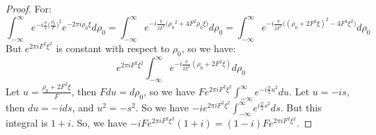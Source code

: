 \documentclass[crop=false,class=book,oneside]{standalone}
\begin{document}
            \begin{proof}
            For:
            \begin{equation*}
                \int_{-\infty}^{\infty} e^{-i\frac{\pi}{2}\big(\frac{\rho_0}{F}\big)^2}e^{-2\pi i \rho_0 \xi}d\rho_0 = \int_{-\infty}^{\infty} e^{-i\frac{\pi}{2F^2}\big({\rho_0}^2 + 4F^2 \rho_0 \xi\big)}d\rho_0 = \int_{-\infty}^{\infty} e^{-i\frac{\pi}{2F^2}\big((\rho_0+2F^2\xi)^2 - 4F^4\xi^2\big)}d\rho_0
            \end{equation*}
            But $e^{2\pi i F^2 \xi^2}$ is constant with respect to $\rho_0$, so we have:
            \begin{equation*}
                e^{2\pi i F^2 \xi^2} \int_{-\infty}^{\infty} e^{-i\frac{\pi}{2F^2}(\rho_0+2F^2\xi)}d\rho_0    
            \end{equation*}
            Let $u = \frac{\rho_0 + 2F^2 \xi}{F}$, then $Fdu = d\rho_0$, so we have $Fe^{2\pi i F^2 \xi^2} \int_{-\infty}^{\infty} e^{-i\frac{\pi}{2}u^2}du$. Let $u = -is$, then $du = -ids$, and $u^2 = -s^2$. So we have $-i e^{2\pi i F^2 \xi^2}\int_{-\infty}^{\infty} e^{i\frac{\pi}{2}s^2}ds$. But this integral is $1+i$. So, we have $-iFe^{2\pi i F^2 \xi^2}(1+i) = (1-i)Fe^{2\pi i F^2 \xi^2}$.
            \end{proof} 
            
\end{document}
